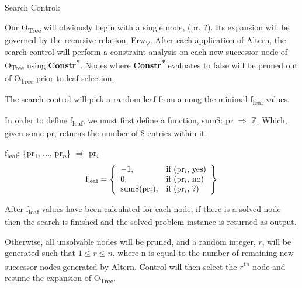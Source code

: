 \documentclass[11pt, oneside]{article}   	%
\newenvironment{cmr}{\fontfamily{cmr}\selectfont}{\par}
\begin{document}

\begin{cmr}
\noindent Search Control:

\noindent Our O\textsubscript{Tree} will obviously begin with a single node, (pr, ?). Its expansion will be governed by the recursive relation, Erw\textsubscript{$\lor$}.
After each application of Altern, the search control will perform a constraint analysis on each new successor node of O\textsubscript{Tree} using \textbf{Constr\textsuperscript{*}}.
Nodes where \textbf{Constr\textsuperscript{*}} evaluates to false will be pruned out of O\textsubscript{Tree} prior to leaf selection.

\noindent The search control will pick a random leaf from among the minimal f\textsubscript{leaf} values.

\noindent In order to define f\textsubscript{leaf}, we must first define a function, sum\$: pr $\Rightarrow$ $\mathbb{Z}$. Which, given some pr, returns the number of \$ entries within it. 
\end{cmr}

\noindent f\textsubscript{leaf}: \{pr\textsubscript{1}, $\dots$, pr\textsubscript{$n$}\} $\Rightarrow$ pr\textsubscript{$i$}\\
    \[
        \text{f\textsubscript{leaf}} = \left\{\begin{array}{ll}
            -1, & \text{if (pr\textsubscript{$i$}, yes)}\\
            0, & \text{if (pr\textsubscript{$i$}, no)}\\
            \text{sum$\$$(pr\textsubscript{$i$})}, & \text{if (pr\textsubscript{$i$}, ?)}
            \end{array}\right\}
      \]

\begin{cmr}
\noindent After f\textsubscript{leaf} values have been calculated for each node, if there is a solved node then the search is finished and the solved problem instance is returned as output.

\noindent Otherwise, all unsolvable nodes will be pruned, and a random integer, $r$, will be generated such that $1 \le r \le n$, where n is equal to the number of remaining new successor nodes generated by Altern.
Control will then select the $r$\textsuperscript{th} node and resume the expansion of O\textsubscript{Tree}.
\end{cmr}

\end{document}
